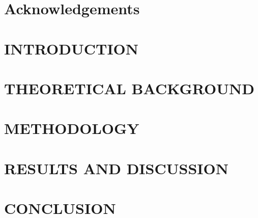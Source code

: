 \documentclass[12pt, a4paper]{report}
\begin{document}
\clearpage

\chapter*{Acknowledgements}


\clearpage
\tableofcontents

\clearpage
\listoffigures
{}

\clearpage
\listoftables
{}
\clearpage

\chapter{\MakeUppercase{Introduction}}


\clearpage
\chapter{\MakeUppercase{theoretical background}}


\clearpage
\chapter{\MakeUppercase{Methodology}}


\clearpage
\chapter{\MakeUppercase{Results and discussion}}


\clearpage
\chapter{\MakeUppercase{conclusion}}


\clearpage
{}



\clearpage
\end{document}
